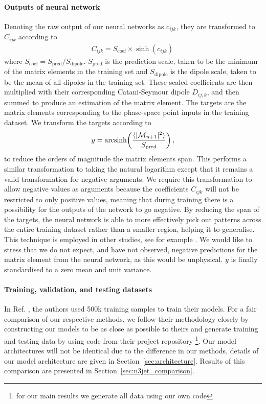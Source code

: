 \documentclass[main.tex]{subfiles}
\begin{document}
\paragraph*{Outputs of neural network}
Denoting the raw output of our neural networks as $c_{ijk}$, they are transformed to $C_{ijk}$ according to
\begin{eqnarray}\label{eq:coef_output}
    C_{ijk} = S_{\mathrm{coef}} \times \sinh{(c_{ijk})} \,
\end{eqnarray}
where $S_{\mathrm{coef}} = S_{\mathrm{pred}} / S_{\mathrm{dipole}}$.
$S_{\mathrm{pred}}$ is the prediction scale, taken to be the minimum of the matrix elements in the training set and $S_{\mathrm{dipole}}$ is the dipole scale, taken to be the mean of all dipoles in the training set.
These scaled coefficients are then multiplied with their corresponding Catani-Seymour dipole $D_{ij,k}$, and then summed to produce an estimation of the matrix element.
The targets are the matrix elements corresponding to the phase-space point inputs in the training dataset. We transform the targets according to
\begin{eqnarray}\label{eq:arcsinh}
    y = \mathrm{arcsinh}{\left(\dfrac{\langle | \mathcal{M}_{n+1}|^{2} \rangle}{S_{\mathrm{pred}}}\right)} \, ,
\end{eqnarray}
to reduce the orders of magnitude the matrix elements span.
This performs a similar transformation to taking the natural logarithm except that it remains a valid transformation for negative arguments.
We require this transformation to allow negative values as arguments because the coefficients $C_{ijk}$ will not be restricted to only positive values, meaning that during training there is a possibility for the outputs of the network to go negative.
By reducing the span of the targets, the neural network is able to more effectively pick out patterns across the entire training dataset rather than a smaller region, helping it to generalise.
This technique is employed in other studies, see for example \cite{Coccaro_2020,Bury_2021}.
We would like to stress that we do not expect, and have not observed, negative predictions for the matrix element from the neural network, as this would be unphysical.
$y$ is finally standardised to a zero mean and unit variance.

\paragraph*{Training, validation, and testing datasets}
In Ref. \cite{Badger:2020uow}, the authors used 500k training samples to train their models.
For a fair comparison of our respective methods, we follow their methodology closely by constructing our models to be as close as possible to theirs and generate training and testing data by using code from their project repository \cite{n3jet_repo}\footnote{for our main results we generate all data using our own code}.
Our model architectures will not be identical due to the difference in our methods, details of our model architecture are given in Section~\ref{sec:architecture}.
Results of this comparison are presented in Section~\ref{sec:n3jet_comparison}.
\end{document}
